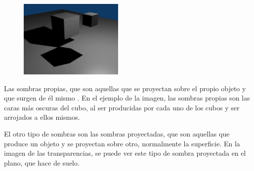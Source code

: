 \documentclass{article}
\begin{document}
\begin{figure}[H]
    \centering
    \includegraphics[width=0.45\textwidth]{imagenes/sombra0004.jpg}
 \end{figure}    

Las sombras propias, que son aquellas que se proyectan sobre el propio objeto y que surgen de él mismo \cite{sombras}. En el ejemplo de la imagen, las sombras propias son las caras más oscuras del cubo, al ser producidas por cada uno de los cubos y ser arrojados a ellos mismos.

\newpage

El otro tipo de sombras son las sombras proyectadas, que son aquellas que produce un objeto y se proyectan sobre otro, normalmente la superficie. En la imagen de las transparencias, se puede ver este tipo de sombra proyectada en el plano, que hace de suelo.
\end{document}
